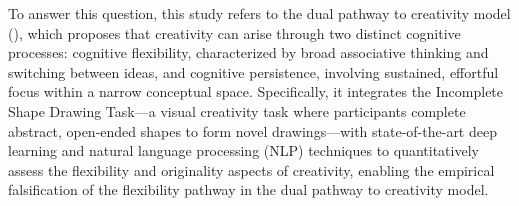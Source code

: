 \documentclass[../MA_Thesis.tex]{subfiles}
\begin{document}
To answer this question, this study refers to the dual pathway to creativity model (\cite{de_dreu_hedonic_2008}), which proposes that creativity can arise through two distinct cognitive processes: cognitive flexibility, characterized by broad associative thinking and switching between ideas, and cognitive persistence, involving sustained, effortful focus within a narrow conceptual space. Specifically, it integrates the Incomplete Shape Drawing Task—a visual creativity task where participants complete abstract, open-ended shapes to form novel drawings—with state-of-the-art deep learning and natural language processing (NLP) techniques to quantitatively assess the flexibility and originality aspects of creativity, enabling the empirical falsification of the flexibility pathway in the dual pathway to creativity model.
\end{document}
